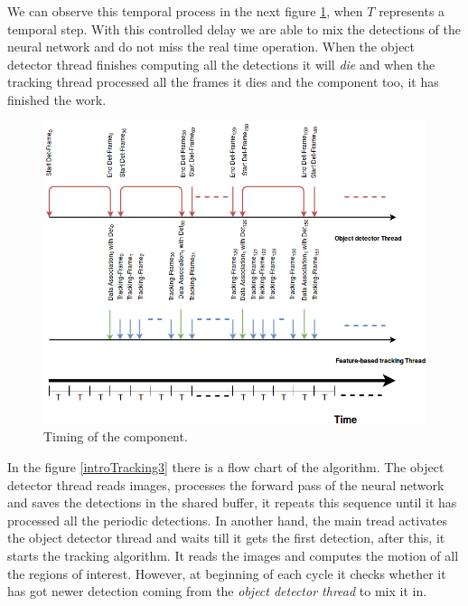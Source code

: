 We can observe this temporal process in the next figure \ref{software2timin}, when $T$ represents a temporal step. With this controlled delay we are able to mix the detections of the neural network and do not miss the real time operation. When the object detector thread finishes computing all the detections it will \textit{die} and when the tracking thread processed all the frames it dies and the component too, it has finished the work. 


\begin{figure}[H]
\centering         
\includegraphics[width=\textwidth]{timesDiagram/timeFInas3.png}
\caption{Timing of the component.} \label{software2timin}
\end{figure}


In the figure \ref{introTracking3} there is a flow chart of the algorithm. The object detector thread reads images, processes the forward pass of the neural network and saves the detections in the shared buffer, it repeats this sequence until it has processed all the periodic detections. In another hand, the main tread activates the object detector thread and waits till it gets the first detection, after this, it starts the tracking algorithm. It reads the images and computes the motion of all the regions of interest. However, at beginning of each cycle it checks whether it has got newer detection coming from the \textit{object detector thread} to mix it in.

